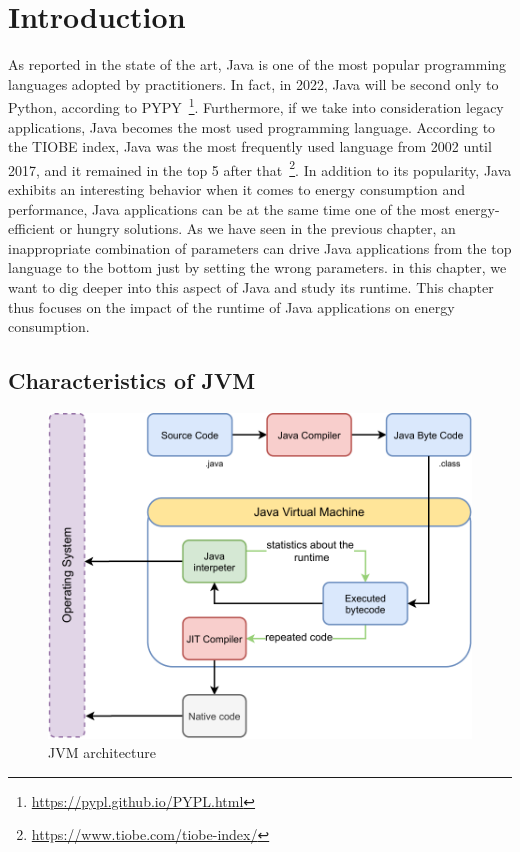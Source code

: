 \section{Introduction}
As reported in the state of the art, Java is one of the most popular programming languages adopted by practitioners. In fact, in 2022, Java will be second only to Python, according to PYPY~\footnote{\url{https://pypl.github.io/PYPL.html}}.
Furthermore, if we take into consideration legacy applications, Java becomes the most used programming language. According to the TIOBE index, Java was the most frequently used language from 2002 until 2017, and it remained in the top 5 after that~\footnote{\url{https://www.tiobe.com/tiobe-index/}}.
In addition to its popularity, Java exhibits an interesting behavior when it comes to energy consumption and performance, Java applications can be at the same time one of the most energy-efficient or hungry solutions.
As we have seen in the previous chapter, an inappropriate combination of parameters can drive Java applications from the top language to the bottom just by setting the wrong parameters.
in this chapter, we want to dig deeper into this aspect of Java and study its runtime.
This chapter thus focuses on the impact of the runtime of Java applications on energy consumption.

\subsection{Characteristics of JVM}
\begin{figure}%
    \centering
    \includegraphics[width=\linewidth]{imgs/Jvm_architecture}
    \caption{JVM architecture}
    \label{fig:JVM_architecture}
\end{figure}

